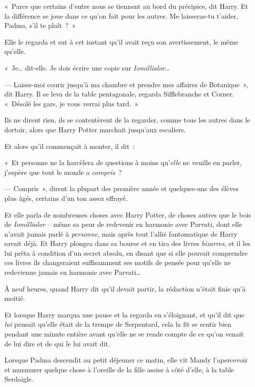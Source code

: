 «~Parce que certains d'entre nous se tiennent au bord du précipice, dit Harry.
Et la différence se joue dans ce qu'on fait pour les autres.
Me laisseras-tu t'aider, Padma, s'il te plaît~?~»

Elle le regarda et sut à cet instant qu'il avait reçu son avertissement, le même qu'elle.

«~Je… dit-elle.
Je dois écrire une copie sur \emph{Iomillialor}…

--- Laisse-moi courir jusqu'à ma chambre et prendre mes affaires de Botanique~», dit Harry.
Il se leva de la table pentagonale, regarda Sifflebranche et Corner.
«~Désolé les gars, je vous verrai plus tard.~»

Ils ne dirent rien, ils se contentèrent de la regarder, comme tous les autres dans le dortoir, alors que Harry Potter marchait jusqu'aux escaliers.

Et alors qu'il commençait à monter, il dit~:

«~Et personne ne la harcèlera de questions à moins qu'\emph{elle} ne veuille en parler, j'espère que tout le monde a \emph{compris}~?

--- Compris~», dirent la plupart des première année et quelques-uns des élèves plus âgés, certains d'un ton assez effrayé.

\later

Et elle parla de nombreuses choses avec Harry Potter, de choses autres que le bois de \emph{Iomillialor} -- même sa peur de redevenir en harmonie avec Parvati, dont elle n'avait jamais parlé à \emph{personne}, mais après tout l'allié fantomatique de Harry savait déjà.
Et Harry plongea dans sa bourse et en tira des livres \emph{bizarres}, et il les lui prêta à condition d'un secret absolu, en disant que si elle pouvait comprendre ces livres ils changeraient suffisamment ses motifs de pensée pour qu'elle ne redevienne jamais en harmonie avec Parvati…

À neuf heures, quand Harry dit qu'il devait partir, la rédaction n'était finie qu'à moitié.

Et lorsque Harry marqua une pause et la regarda en s'éloignant, et qu'il dit que \emph{lui} pensait qu'elle était de la trempe de Serpentard, cela la fit se sentir bien pendant une minute entière avant qu'elle ne se rende compte de ce qu'on venait de lui dire et de qui le lui avait dit.

\later

Lorsque Padma descendit au petit déjeuner ce matin, elle vit Mandy l'apercevoir et murmurer quelque chose à l'oreille de la fille assise à côté d'elle, à la table Serdaigle.

